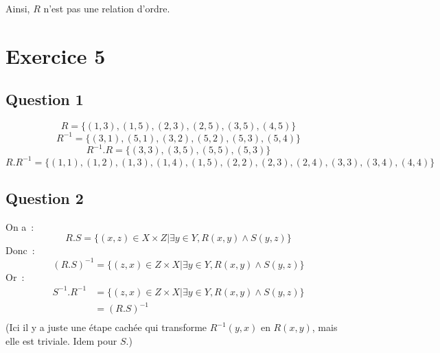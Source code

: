 \documentclass[a4paper]{article}
\begin{document}
    Ainsi, $R$ n'est pas une relation d'ordre.
    \section*{Exercice 5}
    \subsection*{Question 1}
    $$ R = \{
        (1, 3), (1, 5),
        (2, 3), (2, 5),
        (3, 5),
        (4, 5)
    \} $$
    $$ R^{-1} = \{
        (3, 1), (5, 1),
        (3, 2), (5, 2),
        (5, 3),
        (5, 4)
    \}$$
    $$ R^{-1}.R = \{(3,3), (3, 5), (5,5), (5,3)\} $$
    $$ R.R^{-1} = \{(1,1), (1,2), (1,3), (1,4), (1,5), (2,2), (2,3), (2,4), (3,3), (3,4), (4,4)\} $$
    \subsection*{Question 2}
    On a~:
    $$ R.S = \{(x,z)\in X\times Z | \exists y\in Y, R(x,y)\land S(y,z)\} $$
    Donc~:
    $$ (R.S)^{-1} = \{(z,x)\in Z\times X | \exists y\in Y, R(x,y)\land S(y,z)\} $$
    Or~:
    \begin{align*}
        S^{-1}.R^{-1} &= \{(z,x)\in Z\times X | \exists y\in Y, R(x,y)\land S(y,z)\} \\
        &= (R.S)^{-1} \\
    \end{align*}
    (Ici il y a juste une étape cachée qui transforme $R^{-1}(y,x)$ en $R(x,y)$, mais elle est triviale. Idem pour $S$.)
\end{document}
